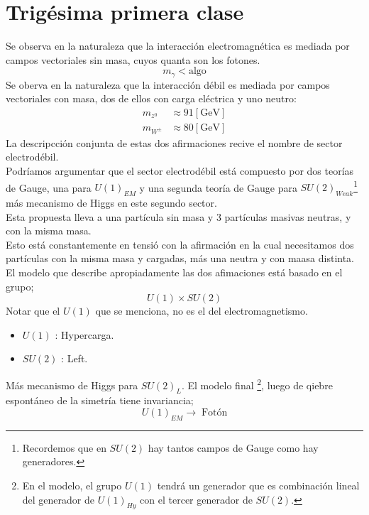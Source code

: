 \documentclass[../main.tex]{subfiles}
\begin{document}
\section{Trigésima primera clase}
Se observa en la naturaleza que la interacción electromagnética es mediada por campos vectoriales sin masa, cuyos quanta son los fotones.
\begin{equation}
  m_{\gamma}< \text{algo} 
 \end{equation}
Se oberva en la naturaleza que la interacción débil es mediada por campos vectoriales con masa, dos de ellos con carga eléctrica y uno neutro:
\begin{align}
  m_{z^0}& \approx 91 [\text{GeV}] \\
  m_{W^{\pm}}& \approx 80 [\text{GeV}]
\end{align}
La descripcción conjunta de estas dos afirmaciones recive el nombre de sector electrodébil. \\
Podríamos argumentar que el sector electrodébil está compuesto por dos teorías de Gauge, una para $U(1)_{EM}$ y una segunda teoría de Gauge para $SU(2)_{Weak}$\footnote{Recordemos que en $SU(2)$ hay tantos campos de Gauge como hay generadores. } más mecanismo de Higgs en este segundo sector. 
\\
Esta propuesta lleva a una partícula sin masa y 3 partículas masivas neutras, y con la misma masa. \\
Esto está constantemente en tensió con la afirmación en la cual necesitamos dos partículas con la misma masa y cargadas, más una neutra y con maasa distinta.
\\
El modelo que describe apropiadamente las dos afimaciones está basado en el grupo;
\begin{equation}
  U(1)\times SU(2)
 \end{equation}
 Notar que el $U(1)$ que se menciona, no es el del electromagnetismo. 
 \begin{itemize}
   \item $U(1)$ : Hypercarga.
   \item $SU(2)$ : Left. 
 \end{itemize}
 Más mecanismo de Higgs para $SU(2)_L$. El modelo final \footnote{En el modelo, el grupo $U(1)$ tendrá un generador que es combinación lineal del generador de $U(1)_{Hy}$ con el tercer generador de $SU(2)$. }, luego de qiebre espontáneo de la simetría tiene invariancia;
 \begin{equation}
   U(1)_{EM}\rightarrow \; \text{Fotón}
  \end{equation}
\end{document}
